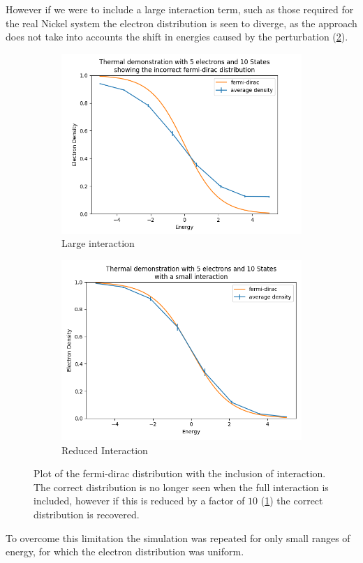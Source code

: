 However if we were to include
a large interaction term, such
as those required for the
real Nickel system the
electron distribution is
seen to diverge, as the approach
does not take into accounts the
shift in energies
caused by the perturbation (\cref{fig:incorrect fermi dirac}).
\begin{figure}[htbp]
    \centering
    \begin{subfigure}{0.45\linewidth}
        \centering
        \includegraphics[width =0.9 \linewidth]{Figures/Simulation/Plot of incorrect fermi dirac distribution on center.png}
        \caption{Large interaction}
    \end{subfigure}
    \hfill
    \begin{subfigure}{0.45\linewidth}
        \centering
        \includegraphics[width = 0.9\linewidth]{Figures/Simulation/Plot of incorrect fermi dirac distribution on center small interaction.png}
        \caption{Reduced Interaction}\label{sub@fig:reduced interaction fermi-dirac}
    \end{subfigure}
    \caption{Plot of the fermi-dirac distribution
        with the inclusion of interaction. The
        correct distribution is no longer seen when
        the full interaction is included, however
        if this is reduced by a factor of \(10\)
        (\cref{sub@fig:reduced interaction fermi-dirac})
        the correct distribution is recovered.}\label{fig:incorrect fermi dirac}
\end{figure}
To overcome this limitation
the simulation was repeated
for only small ranges of energy,
for which the electron distribution
was uniform.

